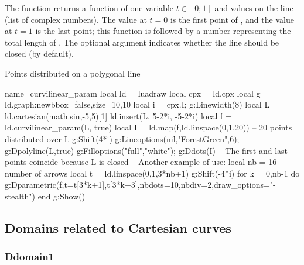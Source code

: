 The function  returns a function of one variable $t\in[0;1]$ and values ​​on the line  (list of complex numbers). The value at $t=0$ is the first point of , and the value at $t=1$ is the last point; this function is followed by a number representing the total length of . The optional argument  indicates whether the line  should be closed (\false by default).

\begin{demo}{Points distributed on a polygonal line}
\begin{luadraw}{name=curvilinear_param}
local ld = luadraw
local cpx = ld.cpx
local g = ld.graph:new{bbox=false,size={10,10}}
local i = cpx.I; g:Linewidth(8)
local L = ld.cartesian(math.sin,-5,5)[1]
ld.insert(L, {5-2*i, -5-2*i})
local f = ld.curvilinear_param(L, true)
local I = ld.map(f,ld.linspace(0,1,20)) -- 20 points distributed over L
g:Shift(4*i)
g:Lineoptions(nil,"ForestGreen",6); g:Dpolyline(L,true)
g:Filloptions("full","white"); g:Ddots(I) -- The first and last points coincide because L is closed
-- Another example of use:
local nb = 16 -- number of arrows
local t = ld.linspace(0,1,3*nb+1)
g:Shift(-4*i)
for k = 0,nb-1 do
g:Dparametric(f,{t={t[3*k+1],t[3*k+3]},nbdots=10,nbdiv=2,draw_options="-stealth"})
end
g:Show()
\end{luadraw}
\end{demo}


\subsection{Domains related to Cartesian curves}

\subsubsection{Ddomain1}

